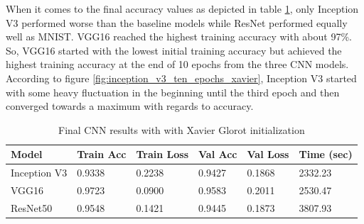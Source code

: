 \documentclass{article}
\theoremstyle{definition}
\theoremstyle{remark}
\begin{document}
When it comes to the final accuracy values as depicted in table \ref{tab:final_cnn_results_xavier}, only Inception V3 performed worse than the baseline models while ResNet performed equally well as MNIST. VGG16 reached the highest training accuracy with about 97\%. So, VGG16 started with the lowest initial training accuracy but achieved the highest training accuracy at the end of 10 epochs from the three CNN models.\\
According to figure \ref{fig:inception_v3_ten_epochs_xavier}, Inception V3 started with some heavy fluctuation in the beginning until the third epoch and then converged towards a maximum with regards to accuracy. 

\begin{table}[h!]
\center
\begin{tabular}{|l|l|l|l|l|l|}
\hline
\textbf{Model} & \textbf{Train Acc} & \textbf{Train Loss} & \textbf{Val Acc} & \textbf{Val Loss} & \textbf{Time (sec)}\\ \hline
Inception V3	& 0.9338 & 0.2238  & 0.9427	& 0.1868 &	2332.23\\ \hline
VGG16  		& 0.9723   & 0.0900   & 0.9583	&	0.2011 &  2530.47\\ \hline
ResNet50  	& 0.9548  & 0.1421 	& 0.9445 &	0.1873	 &  3807.93\\ \hline
\end{tabular}
\caption{Final CNN results with with Xavier Glorot initialization}
\label{tab:final_cnn_results_xavier}
\end{table}


\newpage
\end{document}
